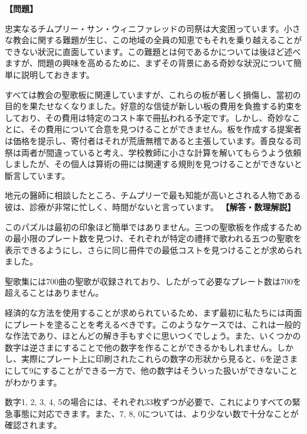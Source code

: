\documentclass[10pt,a4paper,oneside,openany]{ltjsbook}
\begin{document}
\begin{tcolorbox}[colback=softblue,colframe=primaryblue,title=\textbf{第 426 問：hymn板の難問 （原題: THE HYMN-BOARD POSER.）},arc=2mm,boxrule=1pt,breakable]
\textbf{【問題】}\par\vspace{0.3em}
忠実なるチムプリー・サン・ウィニファレッドの司祭は大変困っています。小さな教会に関する難題が生じ、この地域の全員の知恵でもそれを乗り越えることができない狀況に直面しています。この難題とは何であるかについては後ほど述べますが、問題の興味を高めるために、まずその背景にある奇妙な狀況について簡単に説明しておきます。

すべては教会の聖歌板に関連していますが、これらの板が著しく損傷し、當初の目的を果たせなくなりました。好意的な信徒が新しい板の費用を負擔する約束をしており、その費用は特定のコスト率で冊払われる予定です。しかし、奇妙なことに、その費用について合意を見つけることができません。板を作成する提案者は価格を提示し、寄付者はそれが荒唐無稽であると主張しています。善良なる司祭は両者が間違っていると考え、学校教師に小さな計算を解いてもらうよう依頼しましたが、その個人は算術の冊には関連する規則を見つけることができないと斷言しています。

地元の醫師に相談したところ、チムプリーで最も知能が高いとされる人物である彼は、診療が非常に忙しく、時間がないと言っています。
\tcblower
\textbf{【解答・数理解説】}\par\vspace{0.3em}
このパズルは最初の印象ほど簡単ではありません。三つの聖歌板を作成するための最小限のプレート数を見つけ、それぞれが特定の禮拝で歌われる五つの聖歌を表示できるようにし、さらに同じ冊件での最低コストを見つけることが求められました。

聖歌集には700曲の聖歌が収録されており、したがって必要なプレート数は700を超えることはありません。

経済的な方法を使用することが求められているため、まず最初に私たちには両面にプレートを塗ることを考えるべきです。このようなケースでは、これは一般的な作法であり、ほとんどの解き手もすぐに思いつくでしょう。また、いくつかの数字は逆さまにすることで他の数字を作ることができるかもしれません。しかし、実際にプレート上に印刷されたこれらの数字の形狀から見ると、6を逆さまにして9にすることができる一方で、他の数字はそういった扱いができないことがわかります。

数字1, 2, 3, 4, 5の場合には、それぞれ33枚ずつが必要で、これによりすべての緊急事態に対応できます。また、7, 8, 0については、より少ない数で十分なことが確認されます。
\end{tcolorbox}
\end{document}
